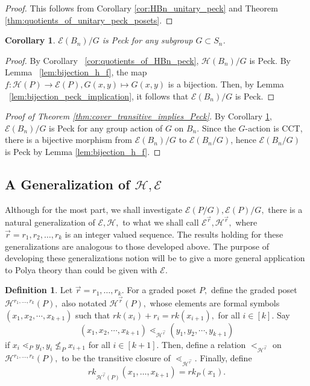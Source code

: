 \documentclass[10 pt]{amsart}
\theoremstyle{plain}
\newtheorem{cor}[thm]{Corollary}
\theoremstyle{definition}
\newtheorem{defn}[thm]{Definition}
\theoremstyle{remark}
\numberwithin{equation}{section}
\renewcommand{\vec}[1]{\overrightarrow{#1}}
\begin{document}
\begin{proof}
This follows from Corollary \ref{cor:HBn_unitary_peck} and Theorem \ref{thm:quotients_of_unitary_peck_posets}.
\end{proof}




\begin{cor}
\label{cor:quotiented_edge_peck}
$\mathcal E(B_n)/G$ is Peck for any subgroup $G\subset S_n$.
\end{cor}
\begin{proof}
By Corollary ~\ref{cor:quotients_of_HBn_peck}, $\mathcal H(B_n)/G$ is Peck. By Lemma ~\ref{lem:bijection_h_f}, the map $f:\mathcal H(P) \rightarrow \mathcal E(P),G(x, y) \mapsto G(x, y)$ is a bijection. Then, by Lemma ~\ref{lem:bijection_peck_implication}, it follows that $\mathcal E(B_n)/G$ is Peck.
\end{proof}

\begin{proof}[Proof of Theorem \ref{thm:cover_transitive_implies_Peck}]
By Corollary \ref{cor:quotiented_edge_peck}, $\mathcal{E}(B_n)/G$ is Peck for any group action of $G$ on $B_n.$ Since the $G$-action is CCT, there is a bijective morphism from $\mathcal{E}(B_n)/G$ to $\mathcal{E}(B_n/G)$, hence $\mathcal{E}(B_n/G)$ is Peck by Lemma \ref{lem:bijection_h_f}.
\end{proof}


\subsection{A Generalization of $\mathcal H,\mathcal E$}\label{ssec:E_generalization}

Although for the most part, we shall investigate \linebreak
$\mathcal E(P/G),\mathcal E(P)/G,$ there is a natural generalization of $\mathcal E,\mathcal H,$ to what we shall call $\mathcal E^{\vec r},\mathcal H^{\vec r},$ where $\vec r = r_1,r_2,\ldots, r_k$ is an integer valued sequence. The results holding for these generalizations are analogous to those developed above. The purpose of developing these generalizations notion will be to give a more general application to Polya theory than could be given with $\mathcal E.$

\begin{defn}
Let $\vec r = r_1,\ldots,r_k.$ For a graded poset $P,$ define the graded poset $\mathcal H^{r_1,\ldots, r_k}(P),$ also notated $\mathcal H^{\vec r}(P),$ whose elements are formal symbols $(x_1, x_2, \cdots, x_{k+1})$ such that $rk(x_i)+r_i = rk(x_{i+1}),$ for all $i \in [k].$ Say 
$$(x_1, x_2, \cdots, x_{k+1})\lessdot_{\mathcal H^{\vec r}} (y_1, y_2, \cdots, y_{k+1})$$
if $x_i \lessdot_P y_i,y_{i} \not \leq_P x_{i+1}$ for all $i \in [k+1].$ Then, define a relation $<_{\mathcal H^{\vec r}}$ on $\mathcal H^{r_1,\ldots, r_k}(P),$ to be the transitive closure of $\lessdot_{\mathcal H^{\vec r}}.$ Finally, define 
$$rk_{\mathcal H^{\vec r}(P)}(x_1,\ldots, x_{k+1}) = rk_P(x_1).$$
\end{defn}
\end{document}
